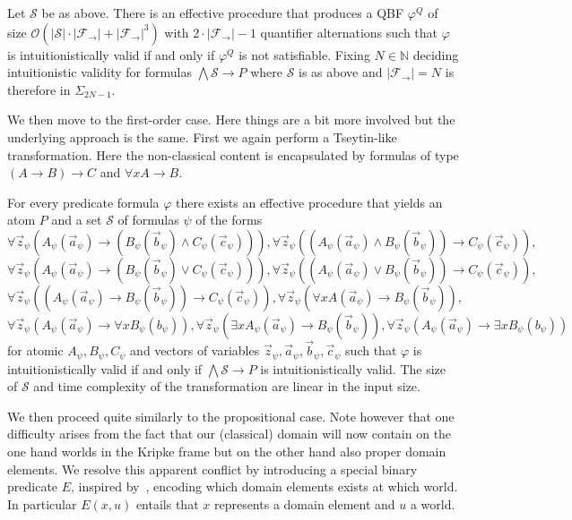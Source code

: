 \documentclass[a4paper,UKenglish,cleveref, autoref, thm-restate]{lipics-v2021}
\begin{document}
\begin{theorem}
	Let $\mathcal S$ be as above. There is an effective procedure that produces a QBF $\varphi^Q$ of size $\mathcal O(|\mathcal S|\cdot|\mathcal F_\to| + |\mathcal F_\to|^3)$ with $2\cdot |\mathcal F_\to|-1$ quantifier alternations such that $\varphi$ is intuitionistically valid if and only if $\varphi^Q$ is not satisfiable. Fixing $N\in\mathbb N$ deciding intuitionistic validity for formulas $\bigwedge \mathcal S\to P$ where $\mathcal S$ is as above and $|\mathcal F_\to| = N$ is therefore in $\Sigma_{2N-1}$.
\end{theorem}

We then move to the first-order case. Here things are a bit more involved but the underlying approach is the same. First we again perform a Tseytin-like transformation. Here the non-classical content is encapsulated by formulas of type $(A\to B)\to C$ and $\forall xA\to B$.

\begin{theorem}
	For every predicate formula $\varphi$ there exists an effective procedure that yields an atom $P$ and a set $\mathcal S$ of formulas $\psi$ of the forms
	$$\forall \vec z_\psi(A_\psi(\vec a_\psi)\to (B_\psi(\vec b_\psi)\wedge C_\psi(\vec c_\psi))), \forall \vec z_\psi((A_\psi(\vec a_\psi)\wedge B_\psi(\vec b_\psi))\to C_\psi(\vec c_\psi)),$$$$\forall \vec z_\psi(A_\psi(\vec a_\psi)\to (B_\psi(\vec b_\psi)\vee C_\psi(\vec c_\psi))),
	\forall \vec z_\psi((A_\psi(\vec a_\psi)\vee B_\psi(\vec b_\psi))\to C_\psi(\vec c_\psi)),$$$$ \forall \vec z_\psi((A_\psi(\vec a_\psi)\to B_\psi(\vec b_\psi))\to C_\psi(\vec c_\psi)),\forall \vec z_\psi(\forall xA(\vec a_\psi)\to B_\psi(\vec b_\psi)),$$$$ \forall \vec z_\psi(A_\psi(\vec a_\psi)\to\forall xB_\psi(b_\psi)), \forall \vec z_\psi(\exists xA_\psi(\vec a_\psi)\to B_\psi(\vec b_\psi)), \forall \vec z_\psi(A_\psi(\vec a_\psi)\to\exists xB_\psi(b_\psi))$$for atomic $A_\psi, B_\psi, C_\psi$ and vectors of variables $\vec z_\psi, \vec a_\psi, \vec b_\psi, \vec c_\psi$ such that $\varphi$ is intuitionistically valid if and only if $\bigwedge\mathcal S\to P$ is intuitionistically valid. The size of $\mathcal S$ and time complexity of the transformation are linear in the input size.
\end{theorem}

We then proceed quite similarly to the propositional case. Note however that one difficulty arises from the fact that our (classical) domain will now contain on the one hand worlds in the Kripke frame but on the other hand also proper domain elements. We resolve this apparent conflict by introducing a special binary predicate $E$, inspired by~\cite{iemhoff2010eskolemization}, encoding which domain elements exists at which world. In particular $E(x, u)$ entails that $x$ represents a domain element and $u$ a world.
\end{document}
